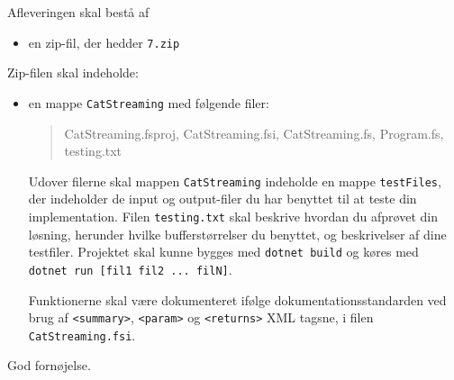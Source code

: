 \documentclass[a4paper,12pt]{article}
\newcommand{\exerciseNumber}{7}
\begin{document}
Afleveringen skal bestå af
\begin{itemize}
  \item en zip-fil, der hedder \texttt{\exerciseNumber\typeLetter.zip}
\end{itemize}
Zip-filen skal indeholde:
\begin{itemize}
\item en mappe \texttt{CatStreaming} med følgende filer:
  \begin{quote}
    CatStreaming.fsproj, CatStreaming.fsi, CatStreaming.fs, Program.fs, testing.txt
  \end{quote}
  Udover filerne skal mappen \texttt{CatStreaming} indeholde en mappe \texttt{testFiles}, der indeholder de input og output-filer du har benyttet til at teste din implementation. Filen \texttt{testing.txt} skal beskrive hvordan du afprøvet din løsning, herunder hvilke bufferstørrelser du benyttet, og beskrivelser af dine testfiler. 
  Projektet skal kunne bygges med \texttt{dotnet build} og køres med \\ \texttt{dotnet run [fil1 fil2 ... filN]}.
  
  Funktionerne skal være dokumenteret ifølge dokumentationsstandarden ved brug af \verb|<summary>|, \verb|<param>| og \verb|<returns>| XML tagsne, i filen \texttt{CatStreaming.fsi}.
\end{itemize}

\flushright God fornøjelse.
\end{document}
